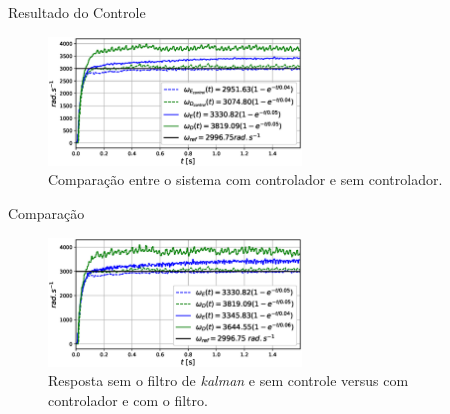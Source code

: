 \begin{frame}{Resultado do Controle}

    \begin{figure}
        \centering
        \includegraphics[width=0.6\textwidth]{figuras/resultados/exp04/controlador_vs_sem_controlador100.eps}
        \caption{Comparação entre o sistema com controlador e sem controlador.}
    \end{figure}
    
\end{frame}

\begin{frame}{Comparação}
    \begin{figure}
        \centering
        \includegraphics[width=0.6\textwidth]{figuras/resultados/exp04/antes_vs_depois100.eps}
        \caption{Resposta sem o filtro de \emph{kalman} e sem controle versus com controlador e com o filtro.}
    \end{figure}
\end{frame}